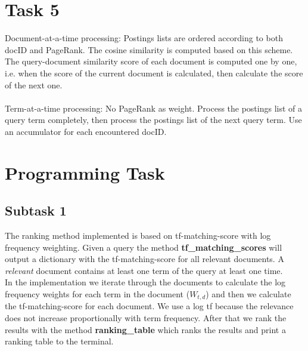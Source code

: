 \documentclass[a4paper]{scrartcl}
\begin{document}
\section*{Task 5}

Document-at-a-time processing: Postings lists are ordered according to both docID and PageRank. The cosine similarity is computed based on this scheme. The query-document similarity score of each document is computed one by one, i.e. when the score of the current document is calculated, then calculate the score of the next one.\\
\\
Term-at-a-time processing: No PageRank as weight. Process the postings list of a query term completely, then process the postings list of the next query term. Use an accumulator for each encountered docID.\\

\section*{Programming Task}

\subsection*{Subtask 1}

The ranking method implemented is based on tf-matching-score with log frequency weighting.
Given a query the method \textbf{tf\_matching\_scores} will output a dictionary with the tf-matching-score for all relevant documents.
A \textit{relevant} document contains at least one term of the query at least one time.\\

In the implementation we iterate through the documents to calculate the log frequency weights for each term in the document ($W_{t,d}$) 
and then we calculate the tf-matching-score for each document. We use a log tf because the relevance does not increase proportionally with term frequency.
After that we rank the results with the method \textbf{ranking\_table} which ranks the results and print a ranking table to the terminal.
\end{document}
